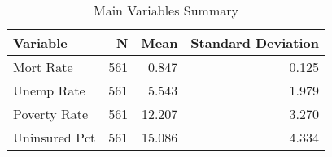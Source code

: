 \begin{table}[H]

\caption{\label{tab:tab:replicatetable2a}Main Variables Summary}
\centering
\begin{tabular}[t]{lrrr}
\toprule
Variable & N & Mean & Standard Deviation\\
\midrule
Mort Rate & 561 & 0.847 & 0.125\\
Unemp Rate & 561 & 5.543 & 1.979\\
Poverty Rate & 561 & 12.207 & 3.270\\
Uninsured Pct & 561 & 15.086 & 4.334\\
\bottomrule
\end{tabular}
\end{table}
